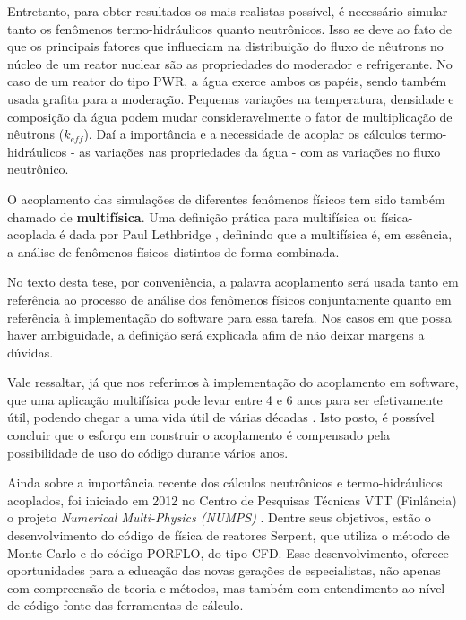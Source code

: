 
Entretanto, para obter resultados os mais realistas possível, é necessário simular 
tanto os fenômenos termo-hidráulicos quanto neutrônicos. Isso 
se deve ao fato de que os principais fatores que influeciam na distribuição do fluxo de 
nêutrons no núcleo de um reator nuclear são as propriedades do moderador e refrigerante. No caso de um
reator do tipo PWR, a água exerce ambos os papéis, sendo também usada grafita para 
a moderação. Pequenas variações na temperatura, densidade e composição 
da água podem mudar consideravelmente o fator de multiplicação de nêutrons ($k_{eff}$). Daí a importância e 
a necessidade de acoplar os cálculos termo-hidráulicos - as variações nas propriedades da água - com as variações 
no fluxo neutrônico.

O acoplamento das simulações de diferentes fenômenos físicos tem sido também chamado de
\textbf{multifísica}. 
Uma definição prática para multifísica ou física-acoplada é dada por Paul Lethbridge \cite{Lethbridge2005}, definindo que 
a multifísica é, em essência, a análise de fenômenos físicos distintos de forma combinada.

No texto desta tese, 
por conveniência, a palavra acoplamento será usada tanto em referência ao processo de análise dos fenômenos físicos conjuntamente 
quanto em referência à implementação do software para essa tarefa. Nos casos em que possa haver ambiguidade, 
a definição será explicada afim de não deixar margens a dúvidas.

Vale ressaltar, já que nos referimos à implementação do acoplamento em software, que uma aplicação multifísica 
pode levar entre 4 e 6 anos para ser efetivamente útil, podendo chegar a uma vida útil de várias décadas 
\cite{Graham2004}. Isto posto, é possível concluir que o esforço em construir o acoplamento é compensado 
pela possibilidade de uso do código durante vários anos.

Ainda sobre a importância recente dos cálculos neutrônicos e termo-hidráulicos acoplados, foi iniciado em 2012
no Centro de Pesquisas Técnicas VTT (Finlância) o projeto \textit{Numerical Multi-Physics (NUMPS)} \cite{Leppanen2015}.
Dentre seus objetivos, estão o desenvolvimento do código de física de reatores Serpent, que utiliza o método de
Monte Carlo e do código PORFLO, do tipo CFD. Esse desenvolvimento, oferece oportunidades para a educação das novas
gerações de especialistas, não apenas com compreensão de teoria e métodos, mas também com entendimento ao nível de
código-fonte das ferramentas de cálculo.

